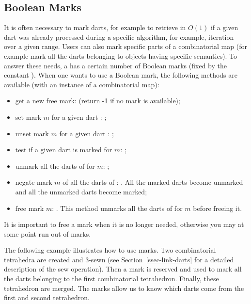 \begin{ccAdvanced}
\subsection{Boolean Marks\label{ssec-adv-marks}}
It is often necessary to mark darts, for example to retrieve in $O(1)$
if a given dart was already processed during a specific algorithm, for example, 
iteration over a given range. Users can also mark specific parts of a
combinatorial map (for example mark all the darts belonging to objects
having specific semantics).  To answer these needs, a
 has a certain number of Boolean marks (fixed by
the constant ).  When one
wants to use a Boolean mark, the following methods are available (with
 an instance of a combinatorial map):
\begin{itemize}
\item get a new free mark:  (return
  -1 if no mark is available);

\item set mark $m$ for a given dart : ;
\item unset mark $m$ for a given dart : ;
\item test if a given dart  is marked for $m$: ;

\item unmark all the darts of  for $m$: ;

\item negate mark $m$ of all the darts of : .
  All the marked darts become unmarked and all the unmarked darts become marked;

\item free mark $m$:
  . This method unmarks all the darts of 
  for $m$ before freeing it.%
\end{itemize}

It is important to free a mark when it is no longer needed, otherwise 
you may at some point run out of marks. 

The following example illustrates how to use marks.  Two combinatorial
tetrahedra are created and 3-sewn (see Section~\ref{ssec-link-darts}
for a detailed description of the sew operation). Then a mark is
reserved and used to mark all the darts belonging to the first
combinatorial tetrahedron. Finally, these tetrahedron are merged.  The
marks allow us to know which darts come from the first and second
tetrahedron.


\end{ccAdvanced}

